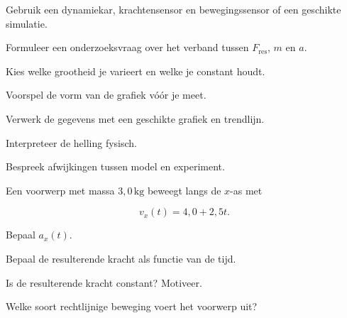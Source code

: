 \documentclass{ximera}
\begin{document}
\begin{oefening}{\oefU}

Gebruik een dynamiekar, krachtensensor en bewegingssensor of een
geschikte simulatie.

\begin{question}
Formuleer een onderzoeksvraag over het verband tussen
$F_{\mathrm{res}}$, $m$ en $a$.
\end{question}

\begin{question}
Kies welke grootheid je varieert en welke je constant houdt.
\end{question}

\begin{question}
Voorspel de vorm van de grafiek vóór je meet.
\end{question}

\begin{question}
Verwerk de gegevens met een geschikte grafiek en trendlijn.
\end{question}

\begin{question}
Interpreteer de helling fysisch.
\end{question}

\begin{question}
Bespreek afwijkingen tussen model en experiment.
\end{question}

\end{oefening}




\begin{oefening}{\oefU\ESS}

Een voorwerp met massa $3,0\,\mathrm{kg}$ beweegt langs de $x$-as met

\[
v_x(t)=4,0+2,5t.
\]

\begin{question}
Bepaal $a_x(t)$.
\end{question}

\begin{question}
Bepaal de resulterende kracht als functie van de tijd.
\end{question}

\begin{question}
Is de resulterende kracht constant? Motiveer.
\end{question}

\begin{question}
Welke soort rechtlijnige beweging voert het voorwerp uit?
\end{question}

\end{oefening}
\end{document}
